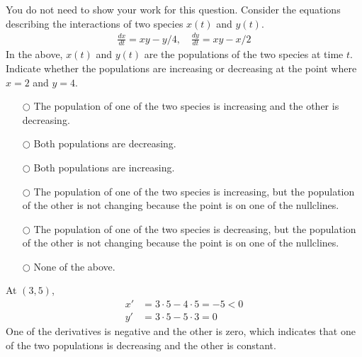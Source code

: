 \ifnum {}
\question[1] You do not need to show your work for this question. Consider the equations describing the interactions of two species $x(t)$ and $y(t)$.
\begin{align}
    \frac{dx}{dt} = xy-y/4, \quad \frac{dy}{dt} = xy-x/2
\end{align}
In the above, $x(t)$ and $y(t)$ are the populations of the two species at time $t$. Indicate whether the populations are increasing or decreasing at the point where $x=2$ and $y=4$. 
\begin{itemize}
    \item[$\bigcirc$] The population of one of the two species is increasing and the other is decreasing. 
    \item[$\bigcirc$]Both populations are decreasing.
    \item[$\bigcirc$]Both populations are increasing.
    \item[$\bigcirc$]The population of one of the two species is increasing, but the population of the other is not changing because the point is on one of the nullclines. 
    \item[$\bigcirc$]The population of one of the two species is decreasing, but the population of the other is not changing because the point is on one of the nullclines. 
    \item[$\bigcirc$]None of the above.
\end{itemize}
\ifnum {} {\color{DarkBlue}
At $(3,5)$, 
\begin{align}
    x' &= 3\cdot5 - 4\cdot 5 = - 5 < 0\\
    y' &= 3\cdot5-5\cdot3 = 0 
\end{align}
One of the derivatives is negative and the other is zero, which indicates that one of the two populations is decreasing and the other is constant. 
} 
\else 
\vspace{0.5cm}
\fi    
\fi 


